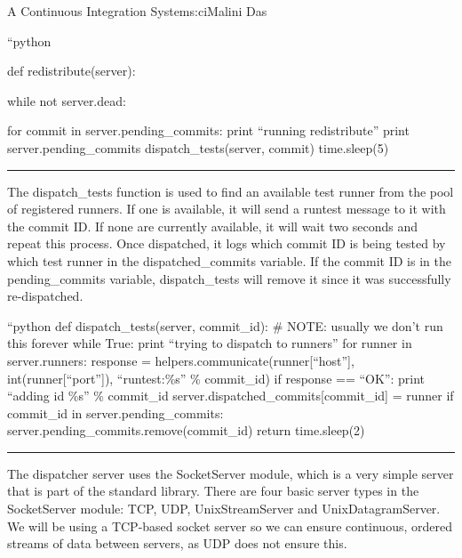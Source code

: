 \begin{aosachapter}{A Continuous Integration System}{s:ci}{Malini Das}
\begin{aosadescription}
\item[``python]
\begin{aosadescription}
\item[def redistribute(server):]
\begin{aosadescription}
\item[while not server.dead:]
\begin{aosadescription}

\item[for commit in server.pending\_commits:]
print ``running redistribute'' print server.pending\_commits
dispatch\_tests(server, commit) time.sleep(5)
\end{aosadescription}
\end{aosadescription}
\end{aosadescription}
\end{aosadescription}

\begin{center}\rule{3in}{0.4pt}\end{center}

The dispatch\_tests function is used to find an available test runner
from the pool of registered runners. If one is available, it will send a
runtest message to it with the commit ID. If none are currently
available, it will wait two seconds and repeat this process. Once
dispatched, it logs which commit ID is being tested by which test runner
in the dispatched\_commits variable. If the commit ID is in the
pending\_commits variable, dispatch\_tests will remove it since it was
successfully re-dispatched.

``python def dispatch\_tests(server, commit\_id): \# NOTE: usually we
don't run this forever while True: print ``trying to dispatch to
runners'' for runner in server.runners: response =
helpers.communicate(runner{[}``host''{]}, int(runner{[}``port''{]}),
``runtest:\%s'' \% commit\_id) if response == ``OK'': print ``adding id
\%s'' \% commit\_id server.dispatched\_commits{[}commit\_id{]} = runner
if commit\_id in server.pending\_commits:
server.pending\_commits.remove(commit\_id) return time.sleep(2)

\begin{center}\rule{3in}{0.4pt}\end{center}

The dispatcher server uses the SocketServer module, which is a very
simple server that is part of the standard library. There are four basic
server types in the SocketServer module: TCP, UDP, UnixStreamServer and
UnixDatagramServer. We will be using a TCP-based socket server so we can
ensure continuous, ordered streams of data between servers, as UDP does
not ensure this.


\end{aosachapter}
